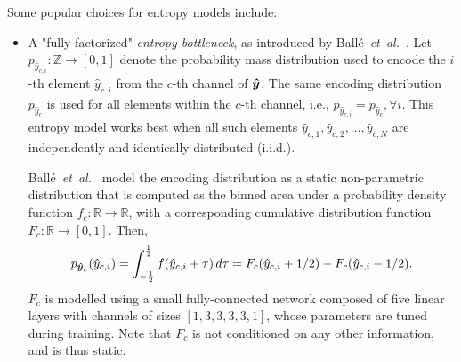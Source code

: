 Some popular choices for entropy models include:
%
\begin{itemize}

  \item
    A "fully factorized" \emph{entropy bottleneck}, as introduced by Ballé~\emph{et~al.}~\cite{balle2018variational}.
    Let $p_{{\hat{y}}_{c,i}} : \mathbb{Z} \to [0, 1]$ denote the probability mass distribution used to encode the $i$-th element $\hat{y}_{c,i}$ from the $c$-th channel of ${\boldsymbol{\hat{y}}}$.
    The same encoding distribution $p_{{\hat{y}}_c}$ is used for all elements within the $c$-th channel, i.e., $p_{{\hat{y}}_{c,i}} = p_{{\hat{y}}_c}, \forall i$.
    This entropy model works best when all such elements $\hat{y}_{c,1}, \hat{y}_{c,2}, \ldots, \hat{y}_{c,N}$ are independently and identically distributed (i.i.d.).

    Ballé~\emph{et~al.}~\cite{balle2018variational} model the encoding distribution as a static non-parametric distribution that is computed as the binned area under a probability density function $f_{c} : \mathbb{R} \to \mathbb{R}$, with a corresponding cumulative distribution function $F_{c} : \mathbb{R} \to [0, 1]$.
    Then,
    \begin{equation}
      \label{eqn:p_y_c_integral}
      p_{{\boldsymbol{\hat{y}}}_c}(\hat{y}_{c,i})
      = \int_{-\frac{1}{2}}^{\frac{1}{2}} f(\hat{y}_{c,i} + \tau) \, d\tau
      = F_{c}(\hat{y}_{c,i} + 1/2) - F_{c}(\hat{y}_{c,i} - 1/2).
    \end{equation}
    $F_{c}$ is modelled using a small fully-connected network composed of five linear layers with channels of sizes $[1, 3, 3, 3, 3, 1]$, whose parameters are tuned during training.
    Note that $F_{c}$ is not conditioned on any other information, and is thus static.


\end{itemize}
